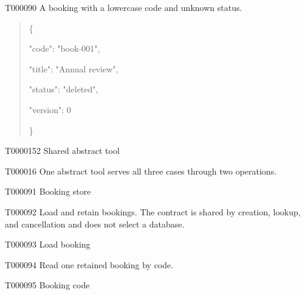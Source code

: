 \documentclass[11pt,a4paper]{article}
\begin{document}
\begin{atlasparagraph}{T000090}
A booking with a lowercase code and unknown status.
\end{atlasparagraph}
\par\noindent\begin{minipage}{\linewidth}
\begin{quote}\small\ttfamily\raggedright
\noindent \{\par
\noindent   "code":\allowbreak{} "book-\allowbreak{}001",\par
\noindent   "title":\allowbreak{} "Annual review",\par
\noindent   "status":\allowbreak{} "deleted",\par
\noindent   "version":\allowbreak{} 0\par
\noindent \}\par
\end{quote}
\end{minipage}\par
{}
\begin{atlasheading}{T000015}{2}
Shared abstract tool
\end{atlasheading}
\begin{atlasparagraph}{T000016}
One abstract tool serves all three cases through two operations.
\end{atlasparagraph}
\begin{atlastext}{T000091}
Booking store
\end{atlastext}
\begin{atlasparagraph}{T000092}
Load and retain bookings. The contract is shared by creation, lookup, and cancellation and does not select a database.
\end{atlasparagraph}
\begin{atlastext}{T000093}
Load booking
\end{atlastext}
\begin{atlasparagraph}{T000094}
Read one retained booking by code.
\end{atlasparagraph}
\begin{atlastext}{T000095}
Booking code
\end{atlastext}
\end{document}
